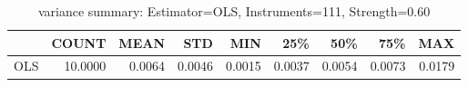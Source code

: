 \begin{table}[ht]
\centering
\caption{variance summary: Estimator=OLS, Instruments=111, Strength=0.60}
\begin{tabular}{lrrrrrrrr}
\toprule
 & COUNT & MEAN & STD & MIN & 25\% & 50\% & 75\% & MAX \\
\midrule
OLS & 10.0000 & 0.0064 & 0.0046 & 0.0015 & 0.0037 & 0.0054 & 0.0073 & 0.0179 \\
\bottomrule
\end{tabular}
\end{table}
